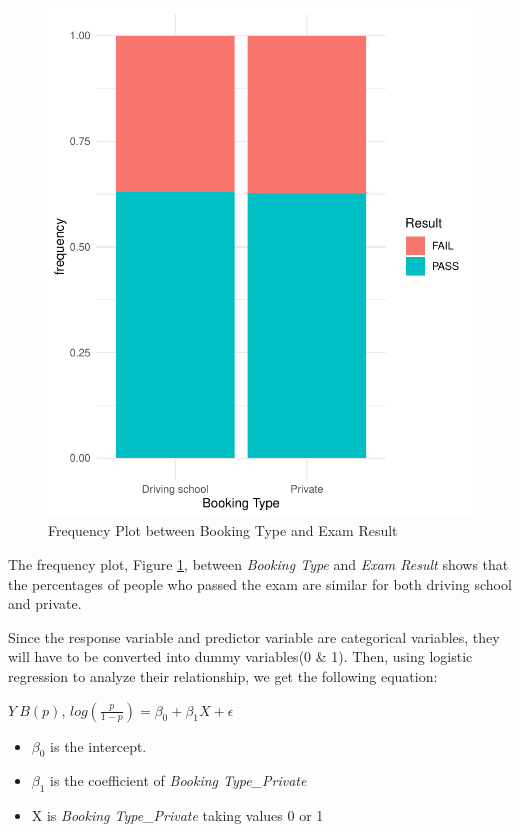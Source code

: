 \documentclass[11pt,a4paper,]{article}
\begin{document}
\begin{figure}

{\centering \includegraphics{Assignment4_files/figure-latex/frequency-1} 

}

\caption{Frequency Plot between Booking Type and Exam Result}\label{fig:frequency}
\end{figure}

The frequency plot, Figure \ref{fig:frequency}, between \emph{Booking Type} and \emph{Exam Result} shows that the percentages of people who passed the exam are similar for both driving school and private.

Since the response variable and predictor variable are categorical variables, they will have to be converted into dummy variables(0 \& 1). Then, using logistic regression to analyze their relationship, we get the following equation:

\(Y ~ B(p)\), \(log(\frac{p}{1-p}) = \beta_0 +\beta_1 X + \epsilon\)

\begin{itemize}
\item
  \(\beta_0\) is the intercept.
\item
  \(\beta_1\) is the coefficient of \emph{Booking Type\_Private}
\item
  X is \emph{Booking Type\_Private} taking values 0 or 1
\end{itemize}
\end{document}
